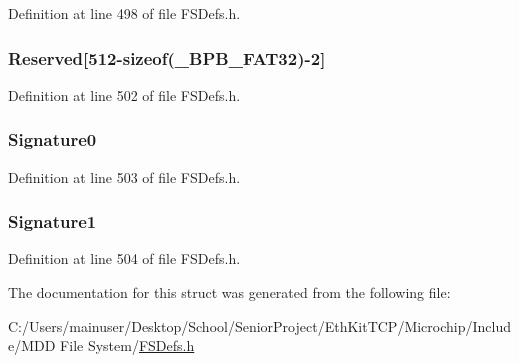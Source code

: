 Definition at line 498 of file F\+S\+Defs.\+h.

\hypertarget{struct___boot_sec_a7dfb0035d3c79ff7468ec857339c9b60}{}
\subsubsection[{Reserved}]{ Reserved\mbox{[}512-\/sizeof({\bf \+\_\+\+B\+P\+B\+\_\+\+F\+A\+T32})-\/2\mbox{]}}\label{struct___boot_sec_a7dfb0035d3c79ff7468ec857339c9b60}


Definition at line 502 of file F\+S\+Defs.\+h.

\hypertarget{struct___boot_sec_a9b49d812a9060bf0b318a52865b75d7c}{}
\subsubsection[{Signature0}]{ Signature0}\label{struct___boot_sec_a9b49d812a9060bf0b318a52865b75d7c}


Definition at line 503 of file F\+S\+Defs.\+h.

\hypertarget{struct___boot_sec_a39b5beb9c358d4403630e620e017d601}{}
\subsubsection[{Signature1}]{ Signature1}\label{struct___boot_sec_a39b5beb9c358d4403630e620e017d601}


Definition at line 504 of file F\+S\+Defs.\+h.



The documentation for this struct was generated from the following file\+:\begin{DoxyCompactItemize}
\item 
C\+:/\+Users/mainuser/\+Desktop/\+School/\+Senior\+Project/\+Eth\+Kit\+T\+C\+P/\+Microchip/\+Include/\+M\+D\+D File System/\hyperlink{_f_s_defs_8h}{F\+S\+Defs.\+h}\end{DoxyCompactItemize}
